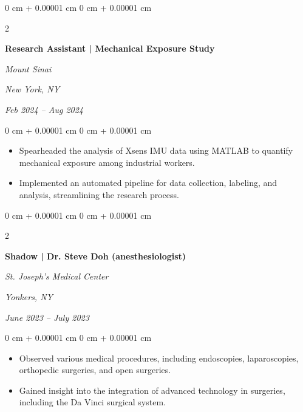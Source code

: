 \documentclass[11pt, letterpaper]{article}
\newenvironment{highlights}{
    \begin{itemize}[
        topsep=0.1 cm,
        parsep=0.1 cm,
        partopsep=0pt,
        itemsep=0pt,
        leftmargin=0 cm + 10pt
    ]
}{
    \end{itemize}
} %
\newenvironment{onecolentry}{
    \begin{adjustwidth}{
        0 cm + 0.00001 cm
    }{
        0 cm + 0.00001 cm
    }
}{
    \end{adjustwidth}
} %
\newenvironment{twocolentry}[2][]{
    \onecolentry
    \def\secondColumn{#2}
    \setcolumnwidth{\fill, 4.5 cm}
    \begin{paracol}{2}
}{
    \switchcolumn \raggedleft \secondColumn
    \end{paracol}
    \endonecolentry
} %
\begin{document}
        \vspace{0.15 cm}

        \begin{twocolentry}{
        \textit{New York, NY}    
            
        \textit{Feb 2024 – Aug 2024}}
            \textbf{Research Assistant | Mechanical Exposure Study}
            
            \textit{Mount Sinai}
        \end{twocolentry}

        \vspace{0.1 cm}
        \begin{onecolentry}
            \begin{highlights}
                \item Spearheaded the analysis of Xsens IMU data using MATLAB to quantify mechanical exposure among industrial workers.
                \item Implemented an automated pipeline for data collection, labeling, and analysis, streamlining the research process.
            \end{highlights}
        \end{onecolentry}


        \vspace{0.15 cm}

        \begin{twocolentry}{
        \textit{Yonkers, NY}    
            
        \textit{June 2023 – July 2023}}
            \textbf{Shadow | Dr. Steve Doh (anesthesiologist)}
            
            \textit{St. Joseph’s Medical Center}
        \end{twocolentry}

        \vspace{0.1 cm}
        \begin{onecolentry}
            \begin{highlights}
                \item Observed various medical procedures, including endoscopies, laparoscopies, orthopedic surgeries, and open surgeries.
                \item Gained insight into the integration of advanced technology in surgeries, including the Da Vinci surgical system.
            \end{highlights}
        \end{onecolentry}
\end{document}
